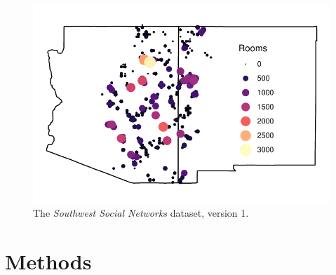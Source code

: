 \documentclass[10pt]{iopart}
\begin{document}
\begin{figure}[!ht]
\centering
\includegraphics[width=.9\linewidth]{figures/site_distribution.pdf}
\caption{The \emph{Southwest Social Networks} dataset, version 1.} 
\label{fig:network-plot}
\end{figure}

\section*{Methods}
\end{document}
